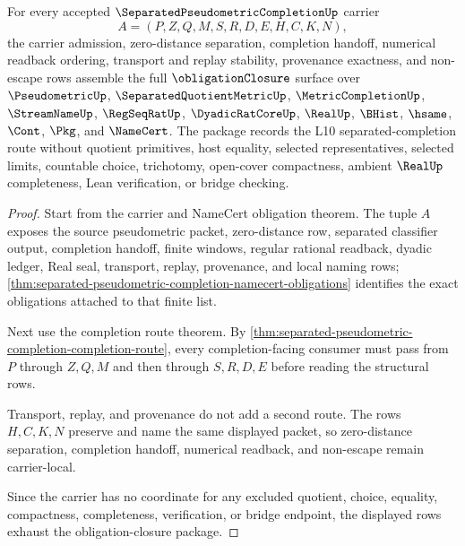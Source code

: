 \begin{theorem}
\label{thm:separated-pseudometric-completion-obligation-closure-package}
For every accepted $\SeparatedPseudometricCompletionUp$ carrier
$$
A=(P,Z,Q,M,S,R,D,E,H,C,K,N),
$$
the carrier admission, zero-distance separation, completion handoff, numerical readback ordering, transport and replay stability, provenance exactness, and non-escape rows assemble the full $\obligationClosure$ surface over $\PseudometricUp$, $\SeparatedQuotientMetricUp$, $\MetricCompletionUp$, $\StreamNameUp$, $\RegSeqRatUp$, $\DyadicRatCoreUp$, $\RealUp$, $\BHist$, $\hsame$, $\Cont$, $\Pkg$, and $\NameCert$. The package records the L10 separated-completion route without quotient primitives, host equality, selected representatives, selected limits, countable choice, trichotomy, open-cover compactness, ambient $\RealUp$ completeness, Lean verification, or bridge checking.
\end{theorem}
\begin{proof}
Start from the carrier and NameCert obligation theorem. The tuple $A$ exposes the source pseudometric packet, zero-distance row, separated classifier output, completion handoff, finite windows, regular rational readback, dyadic ledger, Real seal, transport, replay, provenance, and local naming rows; \autoref{thm:separated-pseudometric-completion-namecert-obligations} identifies the exact obligations attached to that finite list.

Next use the completion route theorem. By \autoref{thm:separated-pseudometric-completion-completion-route}, every completion-facing consumer must pass from $P$ through $Z,Q,M$ and then through $S,R,D,E$ before reading the structural rows.

Transport, replay, and provenance do not add a second route. The rows $H,C,K,N$ preserve and name the same displayed packet, so zero-distance separation, completion handoff, numerical readback, and non-escape remain carrier-local.

Since the carrier has no coordinate for any excluded quotient, choice, equality, compactness, completeness, verification, or bridge endpoint, the displayed rows exhaust the obligation-closure package.
\end{proof}

